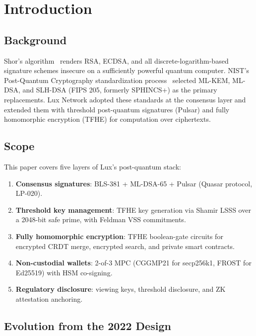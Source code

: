 \section{Introduction}


\subsection{Background}

Shor's algorithm~\cite{shor1999} renders RSA, ECDSA, and all
discrete-logarithm-based signature schemes insecure on a sufficiently
powerful quantum computer. NIST's Post-Quantum Cryptography
standardization process~\cite{nist-pqc} selected ML-KEM,
ML-DSA, and SLH-DSA (FIPS 205, formerly SPHINCS+) as the primary
replacements. Lux Network adopted these standards at the consensus
layer and extended them with threshold post-quantum signatures (Pulsar) and
fully homomorphic encryption (TFHE) for computation over ciphertexts.

\subsection{Scope}

This paper covers five layers of Lux's post-quantum stack:

\begin{enumerate}[nosep]
  \item \textbf{Consensus signatures}: BLS-381 + ML-DSA-65 + Pulsar
        (Quasar protocol, LP-020).
  \item \textbf{Threshold key management}: TFHE key generation via
        Shamir LSSS over a 2048-bit safe prime, with Feldman VSS
        commitments.
  \item \textbf{Fully homomorphic encryption}: TFHE boolean-gate
        circuits for encrypted CRDT merge, encrypted search, and
        private smart contracts.
  \item \textbf{Non-custodial wallets}: 2-of-3 MPC (CGGMP21 for
        secp256k1, FROST for Ed25519) with HSM co-signing.
  \item \textbf{Regulatory disclosure}: viewing keys, threshold
        disclosure, and ZK attestation anchoring.
\end{enumerate}

\subsection{Evolution from the 2022 Design}

